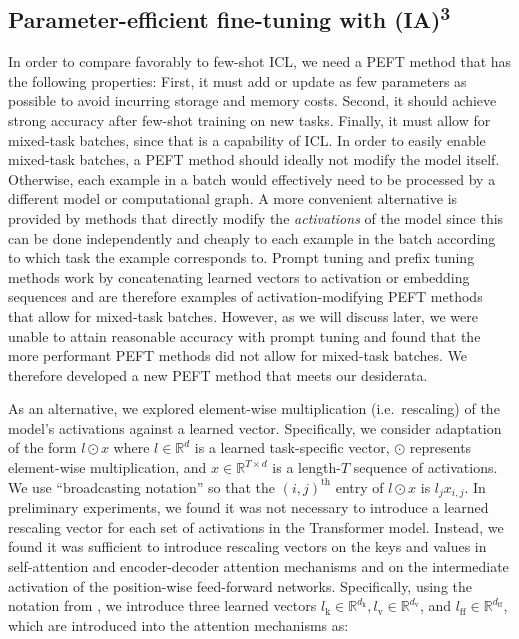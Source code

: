 \subsection{Parameter-efficient fine-tuning with {\selectfont (IA)\textsuperscript{3}}}
\label{sec:ia}

In order to compare favorably to few-shot ICL, we need a PEFT method that has the following properties: First, it must add or update as few parameters as possible to avoid incurring storage and memory costs. Second, it should achieve strong accuracy after few-shot training on new tasks. Finally, it must allow for mixed-task batches, since that is a capability of ICL. In order to easily enable mixed-task batches, a PEFT method should ideally not modify the model itself. Otherwise, each example in a batch would effectively need to be processed by a different model or computational graph. A more convenient alternative is provided by methods that directly modify the \textit{activations} of the model since this can be done independently and cheaply to each example in the batch according to which task the example corresponds to. Prompt tuning and prefix tuning methods \citep{lester2021power,li2021prefix} work by concatenating learned vectors to activation or embedding sequences and are therefore examples of activation-modifying PEFT methods that allow for mixed-task batches. However, as we will discuss later, we were unable to attain reasonable accuracy with prompt tuning and found that the more performant PEFT methods did not allow for mixed-task batches. We therefore developed a new PEFT method that meets our desiderata.

As an alternative, we explored element-wise multiplication (i.e.\ rescaling) of the model's activations against a learned vector. Specifically, we consider adaptation of the form $l \odot x$ where $l \in \mathbb{R}^d$ is a learned task-specific vector, $\odot$ represents element-wise multiplication, and $x \in \mathbb{R}^{T \times d}$ is a length-$T$ sequence of activations. We use ``broadcasting notation'' \cite{van2011numpy} so that the $(i, j)^\mathrm{th}$ entry of $l \odot x$ is $l_jx_{i, j}$. In preliminary experiments, we found it was not necessary to introduce a learned rescaling vector for each set of activations in the Transformer model. Instead, we found it was sufficient to introduce rescaling vectors on the keys and values in self-attention and encoder-decoder attention mechanisms and on the intermediate activation of the position-wise feed-forward networks. Specifically, using the notation from \citet{vaswani2017attention}, we introduce three learned vectors $l_{\mathrm{k}} \in \mathbb{R}^{d_\mathrm{k}}, l_{\mathrm{v}} \in \mathbb{R}^{d_\mathrm{v}}$, and $l_{\mathrm{ff}} \in \mathbb{R}^{d_\mathrm{ff}}$, which are introduced into the attention mechanisms as:

